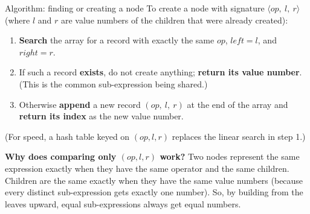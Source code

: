 \documentclass[11pt,a4paper]{article}
\begin{document}
\begin{defbox}{Algorithm: finding or creating a node}
To create a node with signature $\langle \mathit{op},\ l,\ r\rangle$ (where $l$ and $r$ are value numbers of the children that were already created):
\begin{enumerate}[nosep]
\item \textbf{Search} the array for a record with exactly the same $\mathit{op}$, $\mathit{left}=l$, and $\mathit{right}=r$.
\item If such a record \textbf{exists}, do not create anything; \textbf{return its value number}. (This is the common sub-expression being shared.)
\item Otherwise \textbf{append} a new record $(\mathit{op},\ l,\ r)$ at the end of the array and \textbf{return its index} as the new value number.
\end{enumerate}
(For speed, a hash table keyed on $(\mathit{op},l,r)$ replaces the linear search in step 1.)
\end{defbox}

\textbf{Why does comparing only $(\mathit{op},l,r)$ work?} Two nodes represent the same expression exactly when they have the same operator and the same children. Children are the same exactly when they have the same value numbers (because every distinct sub-expression gets exactly one number). So, by building from the leaves upward, equal sub-expressions always get equal numbers.
\end{document}
